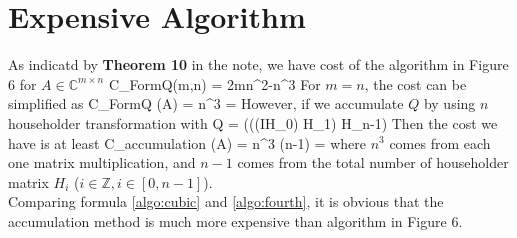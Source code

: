 \documentclass[11pt,a4paper]{article}
\begin{document}
\section{Expensive Algorithm}
As indicatd by {\bf Theorem 10} in the note, we have cost of the algorithm in
Figure 6 for $A\in\mathbb{C}^{m\times n}$ 
\be
C_{FormQ}(m,n)  = 2mn^2-n^3
\ee
For $m = n$, the cost can be simplified as 
\be
C_{FormQ} (A) =  n^3 =  \label{algo:cubic}
\ee
However, if we accumulate $Q$ by using $n$ householder transformation with 
\be
Q = (\hdots((IH_0) H_1) \hdots H_{n-1})
\ee
Then the cost we have is at least 
\be
C_{accumulation} (A) = n^3 \cdot (n-1) =  \label{algo:fourth}
\ee
where $n^3$ comes from each one matrix multiplication, and $n-1$ comes from
the total number of householder matrix $H_i$ ($i\in \mathbb{Z}, i \in
[0,n-1]$). \\
Comparing formula \eqref{algo:cubic} and \eqref{algo:fourth}, it is obvious
that the accumulation method is much more expensive than algorithm in Figure
6. 

\end{document}
